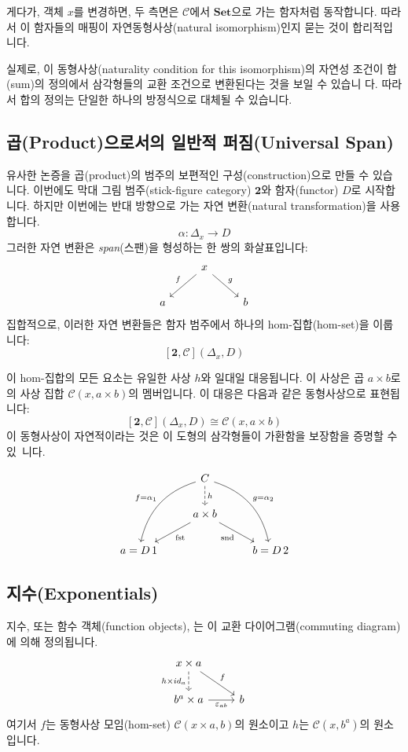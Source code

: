 \documentclass[DaoFP]{subfiles}
\begin{document}
게다가, 객체 $x$를 변경하면, 두 측면은 $\mathcal{C}$에서 $\mathbf{Set}$으로 가는 함자처럼 동작합니다. 따라서 이 함자들의 매핑이 자연동형사상(natural isomorphism)인지 묻는 것이 합리적입니다.

실제로, 이 동형사상(naturality condition for this isomorphism)의 자연성 조건이 합(sum)의 정의에서 삼각형들의 교환 조건으로 변환된다는 것을 보일 수 있습니 다. 따라서 합의 정의는 단일한 하나의 방정식으로 대체될 수 있습니다.

\subsection{곱(Product)으로서의 일반적 퍼짐(Universal Span)}

유사한 논증을 곱(product)의 범주의 보편적인 구성(construction)으로 만들 수 있습니다. 이번에도 막대 그림 범주(stick-figure category) $\mathbf{2}$와 함자(functor) $D$로 시작합니다. 하지만 이번에는 반대 방향으로 가는 자연 변환(natural transformation)을 사용합니다.
\[ \alpha \colon \Delta_x \to D \]
그러한 자연 변환은 \emph{span}(스팬)을 형성하는 한 쌍의 화살표입니다:
\[
 \begin{tikzcd}
 &x
 \arrow[dl, "f"']
 \arrow[dr, "g"]
 \\
 a
 && b
  \end{tikzcd}
\]
집합적으로, 이러한 자연 변환들은 함자 범주에서 하나의 hom-집합(hom-set)을 이룹니다:
\[[\mathbf{2}, \mathcal{C}](\Delta_x, D) \]

이 hom-집합의 모든 요소는 유일한 사상 $h$와 일대일 대응됩니다. 이 사상은 곱 $a \times b$로의 사상 집합 $\mathcal{C}(x, a \times b)$의 멤버입니다. 이 대응은 다음과 같은 동형사상으로 표현됩니다:
\[ [\mathbf{2}, \mathcal{C}](\Delta_x, D)  \cong \mathcal{C}(x, a \times b) \]
이 동형사상이 자연적이라는 것은 이 도형의 삼각형들이 가환함을 보장함을 증명할 수 있~니다.

\[
 \begin{tikzcd}
 & C 
\arrow[d, dashed, "h"]
 \arrow[ddl, bend right, "f = \alpha_1"']
 \arrow[ddr, bend left, "g = \alpha_2"]
\\
&a \times b
 \arrow[dl,  "\text{fst}"]
  \arrow[dr,   "\text{snd}"']
\\
a = D\, 1 && b = D \, 2
 \end{tikzcd}
\]

\subsection{지수(Exponentials)}

지수, 또는 함수 객체(function objects), 는 이 교환 다이어그램(commuting diagram)에 의해 정의됩니다.
\[
 \begin{tikzcd}
 x \times a
 \arrow[d, dashed, "h \times id_a"']
 \arrow[rd, "f"]
 \\
 b^a \times a
 \arrow[r, "\varepsilon_{a b}"']
& b
 \end{tikzcd}
\]
여기서 $f$는 동형사상 모임(hom-set) $\mathcal{C}(x \times a, b)$의 원소이고 $h$는 $\mathcal{C}(x, b^a)$의 원소입니다.
\end{document}
